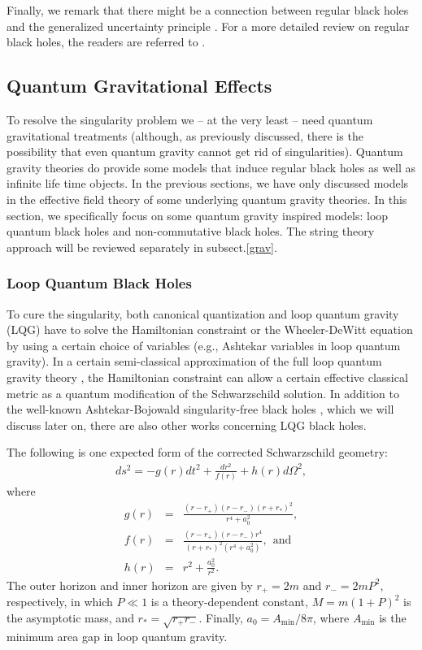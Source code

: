 \documentclass[12pt]{article}
\newcommand{\2}{$^2$}
\newcommand{\3}{$^3$}
\newcommand{\4}{$_4$}
\newcommand{\5}{$_5$}
\begin{document}
Finally, we remark that there might be a connection between regular black holes and the generalized uncertainty principle \cite{1305.3851}. For a more detailed review on regular black holes, the readers are referred to \cite{ansoldi}. 


\subsection{Quantum Gravitational Effects}

To resolve the singularity problem we -- at the very least -- need quantum gravitational treatments (although, as previously discussed, there is the possibility that even quantum gravity cannot get rid of singularities). Quantum gravity theories do provide some models that induce regular black holes as well as infinite life time objects. In the previous sections, we have only discussed models in the effective field theory of some underlying quantum gravity theories. In this section, we specifically focus on some quantum gravity inspired models: loop quantum black holes and non-commutative black holes. The string theory approach will be reviewed separately in subsect.\ref{grav}.

\subsubsection{Loop Quantum Black Holes}

To cure the singularity, both canonical quantization and loop quantum gravity (LQG) have to solve the Hamiltonian constraint or the Wheeler-DeWitt equation by using a certain choice of variables (e.g., Ashtekar variables in loop quantum gravity). In a certain semi-classical approximation of the full loop quantum gravity theory \cite{Modesto:2008im}, the Hamiltonian constraint can allow a certain effective classical metric as a quantum modification of the Schwarzschild solution. {\color{black}In addition to the well-known Ashtekar-Bojowald singularity-free black holes \cite{BA}, which we will discuss later on, there are also other works concerning LQG black holes.}

The following is one expected form of the corrected Schwarzschild geometry\cite{Hossenfelder:2009fc}:
\begin{eqnarray}
ds^{2} = - g(r) dt^{2} + \frac{dr^{2}}{f(r)} + h(r) d\Omega^{2},
\end{eqnarray}
where
\begin{eqnarray}
g(r) &=& \frac{(r-r_{+})(r-r_{-})(r+r_{*})^{2}}{r^{4}+a_{0}^{2}},\\
f(r) &=& \frac{(r-r_{+})(r-r_{-})r^{4}}{(r+r_{*})^{2} (r^{4}+a_{0}^{2})}, ~~\text{and}\\
h(r) &=& r^{2} + \frac{a_{0}^{2}}{r^{2}}.
\end{eqnarray}
The outer horizon and inner horizon are given by $r_{+}=2m$ and $r_{-}=2m P^{2}$, respectively, in which $P \ll 1$ is a theory-dependent constant, $M = m (1+P)^{2}$ is the asymptotic mass, and $r_{*}=\sqrt{r_{+}r_{-}}$. Finally, $a_{0} = A_{\mathrm{min}}/8\pi$, where $A_{\mathrm{min}}$ is the minimum area gap in loop quantum gravity.
\end{document}
